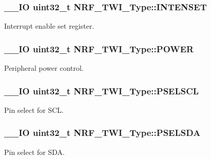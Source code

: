 \subsubsection[{I\+N\+T\+E\+N\+S\+E\+T}]{\setlength{\rightskip}{0pt plus 5cm}\+\_\+\+\_\+\+I\+O uint32\+\_\+t N\+R\+F\+\_\+\+T\+W\+I\+\_\+\+Type\+::\+I\+N\+T\+E\+N\+S\+E\+T}\label{struct_n_r_f___t_w_i___type_adb2c3c8478edbf0d669a849980ec4223}
Interrupt enable set register. \hypertarget{struct_n_r_f___t_w_i___type_a12c8fc4872e1fcdcac71bb481e418fe9}{}
\subsubsection[{P\+O\+W\+E\+R}]{\setlength{\rightskip}{0pt plus 5cm}\+\_\+\+\_\+\+I\+O uint32\+\_\+t N\+R\+F\+\_\+\+T\+W\+I\+\_\+\+Type\+::\+P\+O\+W\+E\+R}\label{struct_n_r_f___t_w_i___type_a12c8fc4872e1fcdcac71bb481e418fe9}
Peripheral power control. \hypertarget{struct_n_r_f___t_w_i___type_a6e79d6cc863daa2da58e4ada813e64d0}{}
\subsubsection[{P\+S\+E\+L\+S\+C\+L}]{\setlength{\rightskip}{0pt plus 5cm}\+\_\+\+\_\+\+I\+O uint32\+\_\+t N\+R\+F\+\_\+\+T\+W\+I\+\_\+\+Type\+::\+P\+S\+E\+L\+S\+C\+L}\label{struct_n_r_f___t_w_i___type_a6e79d6cc863daa2da58e4ada813e64d0}
Pin select for S\+C\+L. \hypertarget{struct_n_r_f___t_w_i___type_acfdad2195a6941d356562796291019db}{}
\subsubsection[{P\+S\+E\+L\+S\+D\+A}]{\setlength{\rightskip}{0pt plus 5cm}\+\_\+\+\_\+\+I\+O uint32\+\_\+t N\+R\+F\+\_\+\+T\+W\+I\+\_\+\+Type\+::\+P\+S\+E\+L\+S\+D\+A}\label{struct_n_r_f___t_w_i___type_acfdad2195a6941d356562796291019db}
Pin select for S\+D\+A. \hypertarget{struct_n_r_f___t_w_i___type_a90ab1da8f9a2ec89814d7b05ea71b0f7}{}
